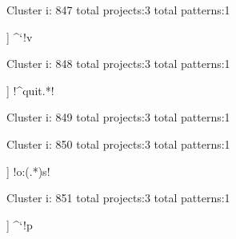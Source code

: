 Cluster i: 847
total projects:3
total patterns:1
\begin{multicols}{1}
\begin{description}[noitemsep,topsep=0pt]
\item [[3] ] \cverb@^`!v\s@
\end{description}
\end{multicols}







Cluster i: 848
total projects:3
total patterns:1
\begin{multicols}{1}
\begin{description}[noitemsep,topsep=0pt]
\item [[3] ] \cverb!^quit.*!
\end{description}
\end{multicols}







Cluster i: 849
total projects:3
total patterns:1
\begin{multicols}{1}
\end{multicols}







Cluster i: 850
total projects:3
total patterns:1
\begin{multicols}{1}
\begin{description}[noitemsep,topsep=0pt]
\item [[3] ] \cverb!o:(.*)s!
\end{description}
\end{multicols}







Cluster i: 851
total projects:3
total patterns:1
\begin{multicols}{1}
\begin{description}[noitemsep,topsep=0pt]
\item [[3] ] \cverb@^`!p\s@
\end{description}
\end{multicols}







